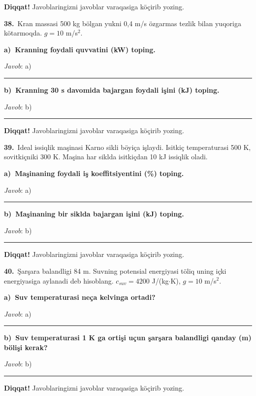 \documentclass[11pt,a4paper]{article}
\newcommand{\blank}{\rule{5cm}{0.4pt}}
\begin{document}
\medskip\noindent\textbf{Diqqat!} Javoblaringizni javoblar varaqasiga köçirib yozing.\par\vspace{10pt}
\noindent\textbf{38.}\ Kran massasi 500 kg bölgan yukni 0,4 m/s özgarmas tezlik bilan yuqoriga kötarmoqda. $g=10$ m/s$^2$.\par\smallskip
\medskip\noindent\textbf{a)\ Kranning foydali quvvatini (kW) toping.}\par
\noindent\textit{Javob}: a)\ \blank\par
\medskip\noindent\textbf{b)\ Kranning 30 s davomida bajargan foydali işini (kJ) toping.}\par
\noindent\textit{Javob}: b)\ \blank\par
\medskip\noindent\textbf{Diqqat!} Javoblaringizni javoblar varaqasiga köçirib yozing.\par\vspace{10pt}
\noindent\textbf{39.}\ Ideal issiqlik maşinasi Karno sikli böyiça işlaydi. Isitkiç temperaturasi 500 K, sovitkiçniki 300 K. Maşina har siklda isitkiçdan 10 kJ issiqlik oladi.\par\smallskip
\medskip\noindent\textbf{a)\ Maşinaning foydali iş koeffitsiyentini (\%) toping.}\par
\noindent\textit{Javob}: a)\ \blank\par
\medskip\noindent\textbf{b)\ Maşinaning bir siklda bajargan işini (kJ) toping.}\par
\noindent\textit{Javob}: b)\ \blank\par
\medskip\noindent\textbf{Diqqat!} Javoblaringizni javoblar varaqasiga köçirib yozing.\par\vspace{10pt}
\noindent\textbf{40.}\ Şarşara balandligi 84 m. Suvning potensial energiyasi töliq uning içki energiyasiga aylanadi deb hisoblang. $c_{suv}=4200$ J/(kg$\cdot$K), $g=10$ m/s$^2$.\par\smallskip
\medskip\noindent\textbf{a)\ Suv temperaturasi neça kelvinga ortadi?}\par
\noindent\textit{Javob}: a)\ \blank\par
\medskip\noindent\textbf{b)\ Suv temperaturasi 1 K ga ortişi uçun şarşara balandligi qanday (m) bölişi kerak?}\par
\noindent\textit{Javob}: b)\ \blank\par
\medskip\noindent\textbf{Diqqat!} Javoblaringizni javoblar varaqasiga köçirib yozing.\par\vspace{10pt}
\end{document}
